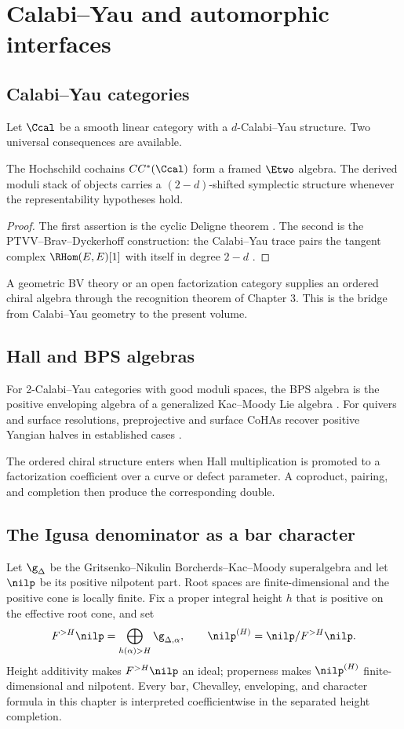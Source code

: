 \part{Calabi--Yau and automorphic interfaces}

\chapter{Calabi--Yau categories}
Let $\Ccal$ be a smooth linear category with a $d$-Calabi--Yau structure. Two universal consequences are available.

\begin{theorem}
The Hochschild cochains $CC^*(\Ccal)$ form a framed $\Etwo$ algebra. The derived moduli stack of objects carries a $(2-d)$-shifted symplectic structure whenever the representability hypotheses hold.
\end{theorem}
\begin{proof}
The first assertion is the cyclic Deligne theorem \cite{BravRozenblyum}. The second is the PTVV--Brav--Dyckerhoff construction: the Calabi--Yau trace pairs the tangent complex $\RHom(E,E)[1]$ with itself in degree $2-d$ \cite{PTVV,BravDyckerhoff}.
\end{proof}

A geometric BV theory or an open factorization category supplies an ordered chiral algebra through the recognition theorem of Chapter 3. This is the bridge from Calabi--Yau geometry to the present volume.

\chapter{Hall and BPS algebras}


For 2-Calabi--Yau categories with good moduli spaces, the BPS algebra is the positive enveloping algebra of a generalized Kac--Moody Lie algebra \cite{DHS}. For quivers and surface resolutions, preprojective and surface CoHAs recover positive Yangian halves in established cases \cite{SVYangians,DPPSSV}.

The ordered chiral structure enters when Hall multiplication is promoted to a factorization coefficient over a curve or defect parameter. A coproduct, pairing, and completion then produce the corresponding double.

\chapter{The Igusa denominator as a bar character}
Let $\g_\Delta$ be the Gritsenko--Nikulin Borcherds--Kac--Moody superalgebra and let $\nilp$ be its positive nilpotent part. Root spaces are finite-dimensional and the positive cone is locally finite. Fix a proper integral height $h$ that is positive on the effective root cone, and set
\[
 F^{>H}\nilp=\bigoplus_{h(\alpha)>H}\g_{\Delta,\alpha},
 \qquad
 \nilp^{(H)}=\nilp/F^{>H}\nilp.
\]
Height additivity makes $F^{>H}\nilp$ an ideal; properness makes $\nilp^{(H)}$ finite-dimensional and nilpotent. Every bar, Chevalley, enveloping, and character formula in this chapter is interpreted coefficientwise in the separated height completion.

